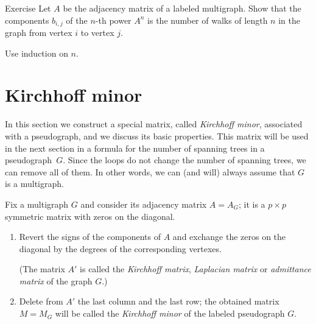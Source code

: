 \begin{thm}{Exercise}
Let $A$ be the adjacency matrix of a labeled multigraph.
Show that the components $b_{i,j}$ of the $n$-th power $A^n$ is the number of walks of length $n$ in the graph from vertex $i$ to vertex $j$. 
\end{thm}

 Use induction on $n$.

\section*{Kirchhoff minor}

In this section we construct a special matrix, called {}\emph{Kirchhoff minor}, associated with a pseudograph,
and we discuss its basic properties.
This matrix will be used in the next section in a formula for the number of spanning trees in a pseudograph~$G$.
Since the loops do not change the number of spanning trees, we can remove all of them.
In other words, we can (and will) always assume that $G$ is a multigraph. 

Fix a multigraph $G$ and consider its adjacency matrix $A=A_G$;
it is a $p{\times}p$ symmetric matrix with zeros on the diagonal.

\begin{enumerate}
\item Revert the signs of the components of $A$ and exchange the zeros on the diagonal by the degrees of the corresponding vertexes. 

(The matrix $A'$ is called the \emph{Kirchhoff matrix}, \emph{Laplacian matrix} or \emph{admittance matrix} of the graph $G$.)
\item Delete from $A'$ the last column and the last row;
the obtained matrix $M=M_G$ will be called the \emph{Kirchhoff minor} of the labeled pseudograph $G$.
\end{enumerate}

